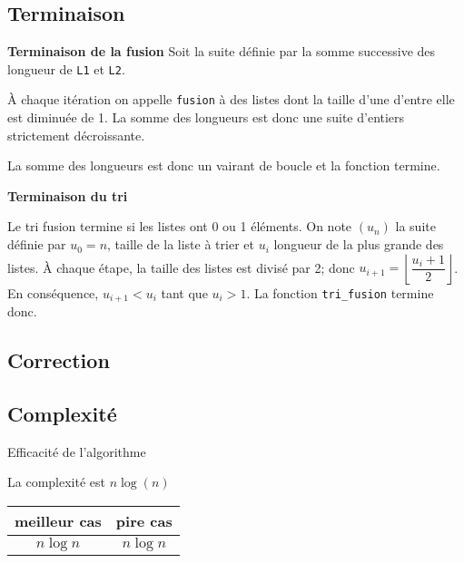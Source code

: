 
\subsection{Terminaison}
\textbf{Terminaison de la fusion}
Soit la suite définie par la somme successive des longueur de \texttt{L1} et \texttt{L2}.  	 

À chaque itération on appelle \texttt{fusion} à des listes dont la taille d'une d'entre elle est diminuée de 1. La somme des longueurs est donc une suite d'entiers strictement décroissante. 

La somme des longueurs est donc un vairant de boucle et la fonction termine. 

\textbf{Terminaison du tri}

Le tri fusion termine si les listes ont 0 ou 1 éléments. 
On note $\left(u_n\right)$ la suite définie par $u_0=n$, taille de la liste à trier et $u_i$ longueur de la plus grande des listes. À chaque étape, la taille des listes est divisé par 2; donc $u_{i+1} = \left\lfloor\dfrac{u_i +1 }{2}\right\rfloor$. En conséquence, $u_{i+1}<u_i$ tant que $u_i>1$.  La fonction \texttt{tri\_fusion} termine donc. 



\subsection{Correction}

\subsection{Complexité}

\begin{prop}{Efficacité de l'algorithme}

La complexité est \textbf{$n\log(n)$}

\begin{center}
\begin{tabular}{|c|c|}
\hline 
 meilleur cas &  pire cas \\ 
\hline 
$n \log n$ & $n \log n$ \\ 
\hline 
\end{tabular} 
\end{center}

\end{prop}



